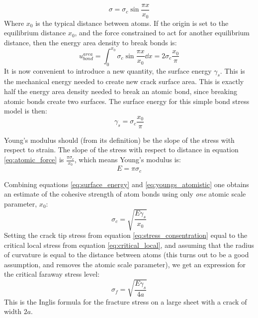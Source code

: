 \begin{equation}
	\sigma = \sigma_c \sin{\frac{\pi x}{x_0}}
	\label{eq:atomic_force}
\end{equation}
Where $x_0$ is the typical distance between atoms. If the origin is set to the equilibrium distance $x_0$, and the force constrained to act for another equilibrium distance, then the energy area density to break bonds is:
\begin{equation}
u_{bond}^{area} = \int_0^{x_0} \sigma_c \sin{\frac{\pi x}{x_0}} \dd x = 2\sigma_c \frac{x_0}{\pi}
\end{equation}
It is now convenient to introduce a new quantity, the surface energy $\gamma_s$. This is the mechanical energy needed to create new crack surface area. This is exactly half the energy area density needed to break an atomic bond, since breaking atomic bonds create two surfaces. The surface energy for this simple bond stress model is then:
\begin{equation}
	\gamma_s = \sigma_c \frac{x_0}{\pi}
	\label{eq:surface_energy}
\end{equation}

Young's modulus should (from its definition) be the slope of the stress with respect to strain. The slope of the stress with respect to distance in equation \ref{eq:atomic_force} is $\frac{\pi\sigma_c}{x_0}$, which means Young's modulus is:
\begin{equation}
E = \pi\sigma_c
\label{eq:youngs_atomistic}
\end{equation}

Combining equations \ref{eq:surface_energy} and \ref{eq:youngs_atomistic} one obtains an estimate of the cohesive strength of atom bonds using only \emph{one} atomic scale parameter, $x_0$:
\begin{equation}
	\sigma_c = \sqrt{\frac{E\gamma_s}{x_0}}
	\label{eq:critical_local}
\end{equation}
Setting the crack tip stress from equation \ref{eq:stress_consentration} equal to the critical local stress from equation \ref{eq:critical_local}, and assuming that the radius of curvature is equal to the distance between atoms (this turns out to be a good assumption, and removes the atomic scale parameter), we get an expression for the critical faraway stress level:
\begin{equation}
	\sigma_f = \sqrt{\frac{E\gamma_s}{4a}}
	\label{eq:inglis_formula}
\end{equation}
This is the Inglis formula for the fracture stress on a large sheet with a crack of width $2a$.

